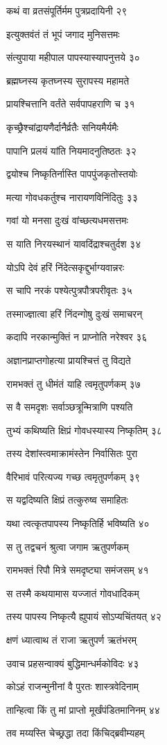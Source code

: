 कथं वा व्रतसंपूर्तिर्मम पुत्रप्रदायिनी २९

इत्युक्तवंतं तं भूपं जगाद मुनिसत्तमः

संत्युपाया महीपाल पापस्यास्यापनुत्तये ३०

ब्रह्मघ्नस्य कृतघ्नस्य सुरापस्य महामते

प्रायश्चित्तानि वर्तंते सर्वपापहराणि च ३१

कृच्छ्रैश्चांद्रायणैर्दानैर्व्रतैः सनियमैर्यमैः

पापानि प्रलयं यांति नियमादनुतिष्ठतः ३२

द्वयोश्च निष्कृतिर्नास्ति पापपुंजकृतोस्तयोः

मत्या गोवधकर्तुश्च नारायणविनिंदितुः ३३

गवां यो मनसा दुःखं वांच्छत्यधमसत्तमः

स याति निरयस्थानं यावदिंद्राश्चतुर्दश ३४

योऽपि देवं हरिं निंदेत्सकृद्दुर्भाग्यवान्नरः

स चापि नरकं पश्येत्पुत्रपौत्रपरीवृतः ३५

तस्माज्ज्ञात्वा हरिं निंदन्गोषु दुःखं समाचरन्

कदापि नरकान्मुक्तिं न प्राप्नोति नरेश्वर ३६

अज्ञानप्राप्तगोहत्या प्रायश्चित्तं तु विद्यते

रामभक्तं तु धीमंतं याहि त्वमृतुपर्णकम् ३७

स वै समदृशः सर्वाञ्छत्रून्मित्राणि पश्यति

तुभ्यं कथिष्यति क्षिप्रं गोवधस्यास्य निष्कृतिम् ३८

तस्य देशांस्त्वमाक्रामंस्तेन निर्वासितः पुरा

वैरिभावं परित्यज्य गच्छ त्वमृतुपर्णकम् ३९

स यद्वदिष्यति क्षिप्रं तत्कुरुष्व समाहितः

यथा त्वत्कृतपापस्य निष्कृतिर्हि भविष्यति ४०

स तु तद्वचनं श्रुत्वा जगाम ऋतुपर्णकम्

रामभक्तं रिपौ मित्रे समदृष्ट्या समंजसम् ४१

स तस्मै कथयामास यज्जातं गोवधादिकम्

तस्य पापस्य निष्कृत्यै ह्युपायं सोऽप्यचिंतयत् ४२

क्षणं ध्यात्वाथ तं राजा ऋतुपर्ण ऋतंभरम्

उवाच प्रहसन्वाक्यं बुद्धिमान्धर्मकोविदः ४३

कोऽहं राजन्मुनीनां वै पुरतः शास्त्रवेदिनाम्

तान्हित्वा किं तु मां प्राप्तो मूर्खंपंडितमानिनम् ४४

तव मय्यस्ति चेच्छ्रद्धा तदा किंचिद्ब्रवीम्यहम्

